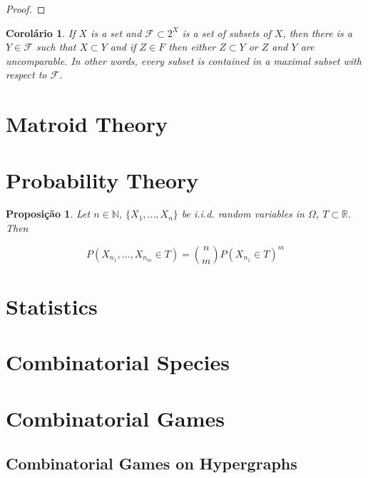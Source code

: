\documentclass[]{article}
\newtheorem{proposition}{Proposição}[section]
\newtheorem{coro}{Corolário}[section]
\theoremstyle{definition}
\theoremstyle{definition}
\newcommand{\bb}{\mathbb}
\begin{document}
	\begin{proof}
		
		
	\end{proof}
	
	\begin{coro}
		If $X$ is a set and $\mathcal{F} \subset 2^X$ is a set of subsets of $X$, then there is a $Y \in \mathcal{F}$ such that $X \subset Y$ and if $Z \in F$ then either $Z \subset Y$ or $Z$ and $Y$ are uncomparable. In other words, every subset is contained in a maximal subset with respect to $\mathcal{F}$.
	\end{coro}
	
	\section{Matroid Theory}
	\section{Probability Theory}
	
	\begin{proposition}
		Let $n \in \bb{N}$, $\{X_1, ..., X_n\}$ be \textit{i.i.d.} random variables in $\Omega$, $T \subset \bb{R}$. Then 
		
		\begin{center}
			$$P( X_{n_1}, ..., X_{n_m} \in T ) = \binom{n}{m}P(X_{n_1} \in T)^m$$
		\end{center}
		
	\end{proposition}
	
	
	
	\section{Statistics}
	
	\section{Combinatorial Species}
	
	
	
	\section{Combinatorial Games}
	\subsection{Combinatorial Games on Hypergraphs}
	
\end{document}
